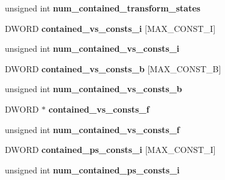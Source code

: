\begin{DoxyCompactItemize}
\item 
\mbox{\label{structwined3d__stateblock_a1a71c020358a20da3f31c5efab495d58}} 
unsigned int {\bfseries num\+\_\+contained\+\_\+transform\+\_\+states}
\item 
\mbox{\label{structwined3d__stateblock_a0bf45aa4a24be4a98bc00c27e1d8da25}} 
D\+W\+O\+RD {\bfseries contained\+\_\+vs\+\_\+consts\+\_\+i} \mbox{[}M\+A\+X\+\_\+\+C\+O\+N\+S\+T\+\_\+I\mbox{]}
\item 
\mbox{\label{structwined3d__stateblock_a27d19486b5d43fc639a5c0c7dfb819f7}} 
unsigned int {\bfseries num\+\_\+contained\+\_\+vs\+\_\+consts\+\_\+i}
\item 
\mbox{\label{structwined3d__stateblock_a173a56f77fd80396abdef52e0322d93b}} 
D\+W\+O\+RD {\bfseries contained\+\_\+vs\+\_\+consts\+\_\+b} \mbox{[}M\+A\+X\+\_\+\+C\+O\+N\+S\+T\+\_\+B\mbox{]}
\item 
\mbox{\label{structwined3d__stateblock_a46642ba610049c5c1ec826e9b9500390}} 
unsigned int {\bfseries num\+\_\+contained\+\_\+vs\+\_\+consts\+\_\+b}
\item 
\mbox{\label{structwined3d__stateblock_a44b37b90fc58bfccf7c52dc18252e867}} 
D\+W\+O\+RD $\ast$ {\bfseries contained\+\_\+vs\+\_\+consts\+\_\+f}
\item 
\mbox{\label{structwined3d__stateblock_a5d6949fda96ca0665cfcd572e5a7f8ba}} 
unsigned int {\bfseries num\+\_\+contained\+\_\+vs\+\_\+consts\+\_\+f}
\item 
\mbox{\label{structwined3d__stateblock_a4889f3e1b1555a13cdc9a961de659531}} 
D\+W\+O\+RD {\bfseries contained\+\_\+ps\+\_\+consts\+\_\+i} \mbox{[}M\+A\+X\+\_\+\+C\+O\+N\+S\+T\+\_\+I\mbox{]}
\item 
\mbox{\label{structwined3d__stateblock_aa498382f42501fe2ce31c7448171e630}} 
unsigned int {\bfseries num\+\_\+contained\+\_\+ps\+\_\+consts\+\_\+i}
\item 
\mbox{\label{structwined3d__stateblock_adccced723708134c137169498f25b149}} 

\end{DoxyCompactItemize}
